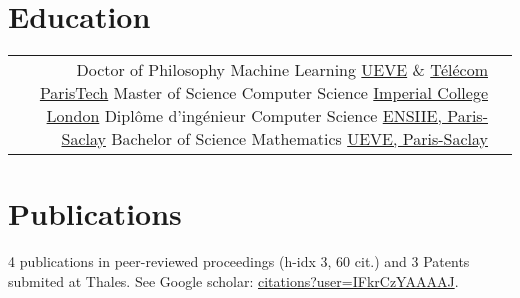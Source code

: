 \documentclass[10pt]{article} %
\begin{document}
\begin{paracol}{2}
\section{Education}
%
%
%
%
%
\begin{supertabular}{rl} %
%
%
    {Doctor of Philosophy} %
    {} %
    {Machine Learning} %
    {\href{https://www.ibisc.univ-evry.fr/}{UEVE} \&
     \href{https://ltci.telecom-paristech.fr/}{T\'el\'ecom ParisTech}}
%
%
    {Master of Science} %
    {} %
    {Computer Science} %
    {\href{http://www.imperial.ac.uk/computing}{Imperial College London}} %
%
%
    {Dipl\^ome d'ing\'enieur} %
    {} %
    {Computer Science} %
    {\href{http://www.ensiie.fr/}{ENSIIE, Paris-Saclay}}
%
%
    {Bachelor of Science} %
    {} %
    {Mathematics} %
    {\href{https://www.univ-evry.fr/accueil.html}{UEVE, Paris-Saclay}}
%
%
\end{supertabular}
%
%
\section{Publications}
4 publications in peer-reviewed proceedings (h-idx 3, 60 cit.) and 3 Patents
submited at Thales. See Google scholar:
\href{https://scholar.google.fr/citations?user=IFkrCzYAAAAJ}{citations?user=IFkrCzYAAAAJ}.
\medskip
%
%

\end{paracol}
\end{document}
